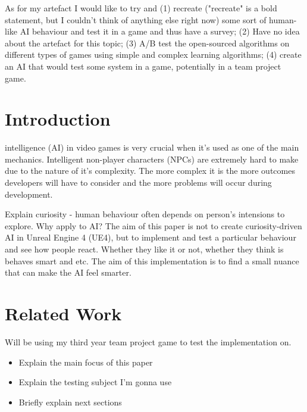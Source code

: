 \documentclass[journal]{IEEEtran}
\begin{document}
As for my artefact I would like to try and (1) recreate ("recreate" is a bold statement, but I couldn't think of anything else right now) some sort of human-like AI behaviour and test it in a game and thus have a survey; (2) Have no idea about the artefact for this topic; (3) A/B test the open-sourced algorithms on different types of games using simple and complex learning algorithms; (4) create an AI that would test some system in a game, potentially in a team project game.

\section{Introduction}
% 
% 
% 
% 
 intelligence (AI) in video games is very crucial when it's used as one of the main mechanics. Intelligent non-player characters (NPCs) are extremely hard to make due to the nature of it's complexity. The more complex it is the more outcomes developers will have to consider and the more problems will occur during development. 

Explain curiosity - human behaviour often depends on person's intensions to explore. Why apply to AI? The aim of this paper is not to create curiosity-driven AI in Unreal Engine 4 (UE4), but to implement and test a particular behaviour and see how people react. Whether they like it or not, whether they think is behaves smart and etc. The aim of this implementation is to find a small nuance that can make the AI feel smarter.

\section{Related Work}
Will be using my third year team project game to test the implementation on.
\begin{itemize}
	\item Explain the main focus of this paper
	\item Explain the testing subject I'm gonna use
	\item Briefly explain next sections
\end{itemize}
\end{document}
